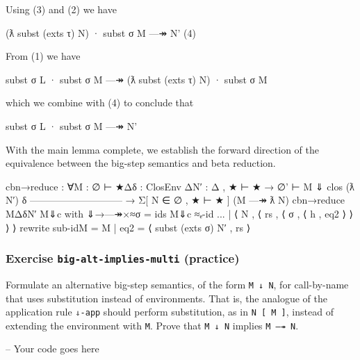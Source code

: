 \begin{itemize}
  Using (3) and (2) we have

  \begin{myDisplay}
    (ƛ subst (exts τ) N) · subst σ M —↠ N'                             (4)
  \end{myDisplay}

  From (1) we have

  \begin{myDisplay}
    subst σ L · subst σ M —↠ (ƛ subst (exts τ) N) · subst σ M
  \end{myDisplay}

  which we combine with (4) to conclude that

  \begin{myDisplay}
    subst σ L · subst σ M —↠ N'
  \end{myDisplay}
\end{itemize}

With the main lemma complete, we establish the forward direction of the
equivalence between the big-step semantics and beta reduction.

\begin{fence}
\begin{code}
cbn→reduce :  ∀{M : ∅ ⊢ ★}{Δ}{δ : ClosEnv Δ}{N′ : Δ , ★ ⊢ ★}
  → ∅' ⊢ M ⇓ clos (ƛ N′) δ
    -----------------------------
  → Σ[ N ∈ ∅ , ★ ⊢ ★ ] (M —↠ ƛ N)
cbn→reduce {M}{Δ}{δ}{N′} M⇓c
    with ⇓→—↠×≈{σ = ids} M⇓c ≈ₑ-id
... | ⟨ N , ⟨ rs , ⟨ σ , ⟨ h , eq2 ⟩ ⟩ ⟩ ⟩ rewrite sub-id{M = M} | eq2 =
      ⟨ subst (exts σ) N′ , rs ⟩
\end{code}
\end{fence}

\hypertarget{exercise-big-alt-implies-multi-practice}{%
\subsubsection{\texorpdfstring{Exercise \texttt{big-alt-implies-multi}
(practice)}{Exercise big-alt-implies-multi (practice)}}\label{exercise-big-alt-implies-multi-practice}}

Formulate an alternative big-step semantics, of the form
\texttt{M\ ↓\ N}, for call-by-name that uses substitution instead of
environments. That is, the analogue of the application rule
\texttt{⇓-app} should perform substitution, as in
\texttt{N\ {[}\ M\ {]}}, instead of extending the environment with
\texttt{M}. Prove that \texttt{M\ ↓\ N} implies \texttt{M\ —↠\ N}.

\begin{fence}
\begin{code}
-- Your code goes here
\end{code}
\end{fence}


